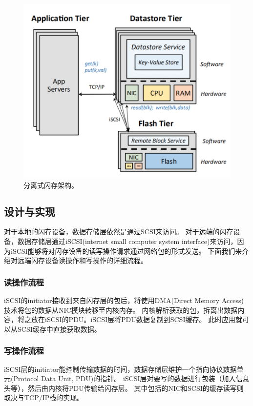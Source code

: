 \begin{figure}
\centering
\includegraphics[scale=0.8]{Figures/storage/disaggreagte_flash_architecture.jpg}
\decoRule
\caption{分离式闪存架构。}
\label{fig:disaggreagte_flash_architecture}
\end{figure}

\subsection{设计与实现}

对于本地的闪存设备，数据存储层依然是通过SCSI来访问。
对于远端的闪存设备，数据存储层通过iSCSI(internet small computer system interface)来访问，因为iSCSI能够将对闪存设备的读写操作请求通过网络包的形式发送。
下面我们来介绍对远端闪存设备读操作和写操作的详细流程。

\subsubsection{读操作流程}
iSCSI的initiator接收到来自闪存层的包后，将使用DMA(Direct Memory Access)技术将包的数据从NIC模块转移至内核内存。
内核解析获取的包，拆离出数据内容，将之放在iSCSI的PDU。iSCSI层将PDU数据复制到SCSI缓存。
此时应用就可以从SCSI缓存中直接获取数据。

\subsubsection{写操作流程}
iSCSI层的initiator能控制传输数据的时间，数据存储层维护一个指向协议数据单元(Protocol Data Unit, PDU)的指针。
iSCSI层对要写的数据进行包装（加入信息头等），然后由内核将PDU传输给闪存层。
其中包括的NIC和SCSI的缓存读写则取决与TCP/IP栈的实现。

